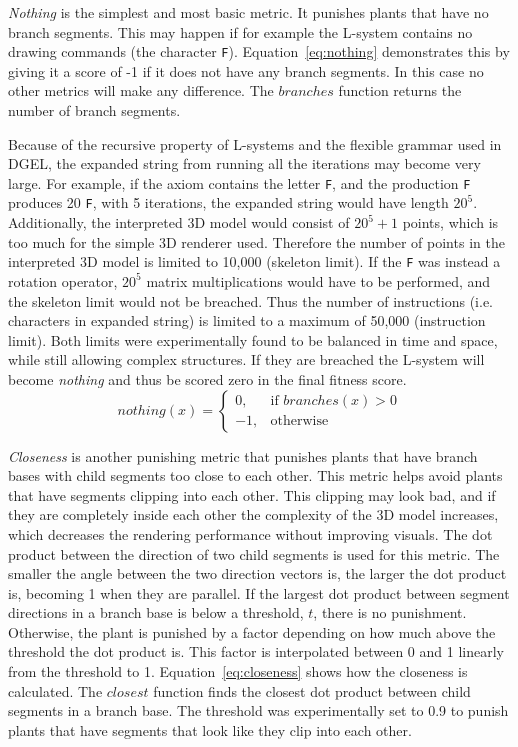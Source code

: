 \textit{Nothing} is the simplest and most basic metric.
It punishes plants that have no \glspl{branch segment}.
This may happen if for example the \gls{L-system} contains no drawing commands (the character \texttt{F}).
Equation~\ref{eq:nothing} demonstrates this by giving it a score of -1 if it does not have any \glspl{branch segment}.
In this case no other metrics will make any difference.
The $branches$ function returns the number of \glspl{branch segment}.

Because of the recursive property of \glspl{L-system} and the flexible grammar used in \gls{DGEL}, the expanded string from running all the iterations may become very large.
For example, if the axiom contains the letter \texttt{F}, and the production \texttt{F} produces 20 \texttt{F}, with 5 iterations, the expanded string would have length $20^5$.
Additionally, the interpreted 3D model would consist of $20^5 + 1$ points, which is too much for the simple 3D renderer used.
Therefore the number of points in the interpreted 3D model is limited to 10,000 (skeleton limit).
If the \texttt{F} was instead a rotation operator, $20^5$ matrix multiplications would have to be performed, and the skeleton limit would not be breached.
Thus the number of instructions (i.e. characters in expanded string) is limited to a maximum of 50,000 (instruction limit).
Both limits were experimentally found to be balanced in time and space, while still allowing complex structures.
If they are breached the \gls{L-system} will become \textit{nothing} and thus be scored zero in the final fitness score.
\begin{equation}
\label{eq:nothing}
    nothing(x) =
    \begin{cases}
        0,& \text{if } branches(x) > 0  \\
        -1,& \text{otherwise}
    \end{cases}
\end{equation}

\textit{Closeness} is another punishing metric that punishes plants that have \glspl{branch base} with \glspl{child segment} too close to each other.
This metric helps avoid plants that have segments clipping into each other.
This clipping may look bad, and if they are completely inside each other the complexity of the 3D model increases, which decreases the rendering performance without improving visuals.
The dot product between the direction of two \glspl{child segment} is used for this metric.
The smaller the angle between the two direction vectors is, the larger the dot product is, becoming 1 when they are parallel.
If the largest dot product between segment directions in a \gls{branch base} is below a threshold, $t$, there is no punishment.
Otherwise, the plant is punished by a factor depending on how much above the threshold the dot product is.
This factor is interpolated between 0 and 1 linearly from the threshold to 1.
Equation~\ref{eq:closeness} shows how the closeness is calculated.
The $closest$ function finds the closest dot product between \glspl{child segment} in a \gls{branch base}.
The threshold was experimentally set to 0.9 to punish plants that have segments that look like they clip into each other.

